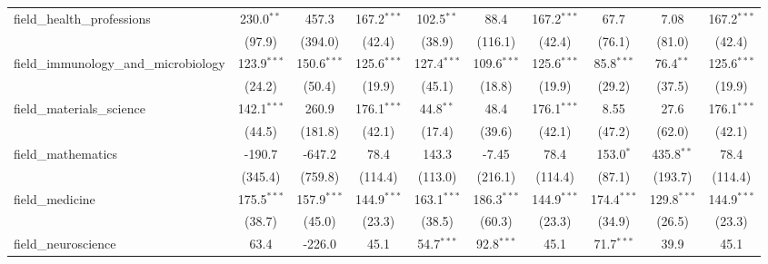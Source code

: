 \begin{tabular}{lccccccccc}
   field\_health\_professions                                  & 230.0$^{**}$     & 457.3           & 167.2$^{***}$  & 102.5$^{**}$  & 88.4          & 167.2$^{***}$  & 67.7          & 7.08          & 167.2$^{***}$\\   
                                                               & (97.9)           & (394.0)         & (42.4)         & (38.9)        & (116.1)       & (42.4)         & (76.1)        & (81.0)        & (42.4)\\   
   field\_immunology\_and\_microbiology                        & 123.9$^{***}$    & 150.6$^{***}$   & 125.6$^{***}$  & 127.4$^{***}$ & 109.6$^{***}$ & 125.6$^{***}$  & 85.8$^{***}$  & 76.4$^{**}$   & 125.6$^{***}$\\   
                                                               & (24.2)           & (50.4)          & (19.9)         & (45.1)        & (18.8)        & (19.9)         & (29.2)        & (37.5)        & (19.9)\\   
   field\_materials\_science                                   & 142.1$^{***}$    & 260.9           & 176.1$^{***}$  & 44.8$^{**}$   & 48.4          & 176.1$^{***}$  & 8.55          & 27.6          & 176.1$^{***}$\\   
                                                               & (44.5)           & (181.8)         & (42.1)         & (17.4)        & (39.6)        & (42.1)         & (47.2)        & (62.0)        & (42.1)\\   
   field\_mathematics                                          & -190.7           & -647.2          & 78.4           & 143.3         & -7.45         & 78.4           & 153.0$^{*}$   & 435.8$^{**}$  & 78.4\\   
                                                               & (345.4)          & (759.8)         & (114.4)        & (113.0)       & (216.1)       & (114.4)        & (87.1)        & (193.7)       & (114.4)\\   
   field\_medicine                                             & 175.5$^{***}$    & 157.9$^{***}$   & 144.9$^{***}$  & 163.1$^{***}$ & 186.3$^{***}$ & 144.9$^{***}$  & 174.4$^{***}$ & 129.8$^{***}$ & 144.9$^{***}$\\   
                                                               & (38.7)           & (45.0)          & (23.3)         & (38.5)        & (60.3)        & (23.3)         & (34.9)        & (26.5)        & (23.3)\\   
   field\_neuroscience                                         & 63.4             & -226.0          & 45.1           & 54.7$^{***}$  & 92.8$^{***}$  & 45.1           & 71.7$^{***}$  & 39.9          & 45.1\\   

\end{tabular}
